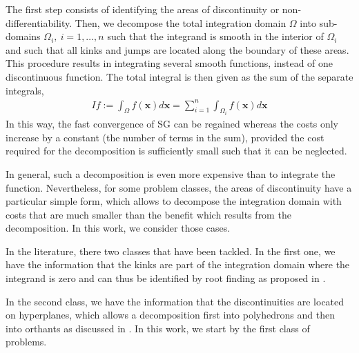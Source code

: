 The first step consists of identifying the areas 
of discontinuity or non-differentiability. Then, we decompose the total integration domain $\Omega$ into sub-domains $\Omega_i,\: i=1,\dots,n$ such that the integrand is smooth in the interior of 
$\Omega_i$ and such that all kinks and jumps are
located along the boundary of these areas.  This procedure results in integrating several smooth functions, instead of one discontinuous function. The total integral is then given
as the sum of the separate integrals, \ie
\begin{align}
	I f := \int_{\Omega} f(\mathbf{x}) d \mathbf{x}=\sum_{i=1}^{n}	\int_{\Omega_i} f(\mathbf{x}) d \mathbf{x}
\end{align}
In this way, the fast convergence of SG can
be regained whereas the costs only increase by a constant (the number of terms in
the sum), provided the cost required for the decomposition is sufficiently small such that it can be neglected.

In general, such a decomposition is even more expensive than to integrate the function. Nevertheless, for some problem classes, the areas of discontinuity have a particular simple form, which allows to decompose the integration domain with
costs that are much smaller than the benefit which results from the decomposition.  In this work, we consider those cases.

In the literature, there two classes that have been tackled. In the first one, we have the information that the kinks are  part of the integration domain where the integrand is zero and can thus be identified by root finding as proposed in \cite{gerstner2007sparse}.

In the second class, we have the information that the discontinuities are located on hyperplanes, which allows a decomposition first into polyhedrons and then into
orthants as discussed in \cite{gerstner2008valuation}. In this work, we start by the first  class of problems.
